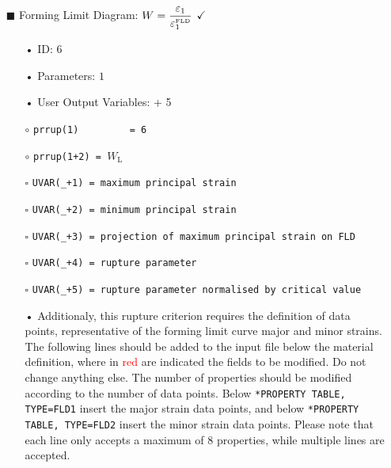 \documentclass[11pt,a4paper,twoside,final,onecolumn,titlepage]{article}
\newcommand{\verified}{\hspace{0.5pt} {\LARGE $\checkmark$}}
\begin{document}
\pagebreak
\begin{itemize}
	\item[\tiny$\blacksquare$] Forming Limit Diagram: $\displaystyle W = \frac{\varepsilon_1}{\varepsilon_1^\textrm{\tiny FLD}}$ \verified{}
	\begin{itemize}
		\item[•] ID: $6$
		\item[•] Parameters: $1$
		\item[•] User Output Variables: + 5\\
		\item[$\circ$] \texttt{prrup(1)\,\,\,\,\,\,\,\,\,= 6}
		\item[$\circ$] \texttt{prrup(1+2) = $W_\textrm{L}$}\\
		\item[\tiny$\square$] \texttt{UVAR(\_+1) = maximum principal strain}
		\item[\tiny$\square$] \texttt{UVAR(\_+2) = minimum principal strain}
		\item[\tiny$\square$] \texttt{UVAR(\_+3) = projection of maximum principal strain on FLD}
		\item[\tiny$\square$] \texttt{UVAR(\_+4) = rupture parameter}
		\item[\tiny$\square$] \texttt{UVAR(\_+5) = rupture parameter normalised by critical value}\\
		\item[•] Additionaly, this rupture criterion requires the definition of data points, representative of the forming limit curve major and minor strains. The following lines should be added to the input file below the material definition, where in \textcolor{red}{red} are indicated the fields to be modified. Do not change anything else. The number of properties should be modified according to the number of data points. Below \texttt{*PROPERTY TABLE, TYPE=FLD1} insert the major strain data points, and below \texttt{*PROPERTY TABLE, TYPE=FLD2} insert the minor strain data points. Please note that each line only accepts a maximum of 8 properties, while multiple lines are accepted.
		\par\bigskip
		\texttt{}
		\par\bigskip
	\end{itemize}
\end{itemize}
\end{document}
